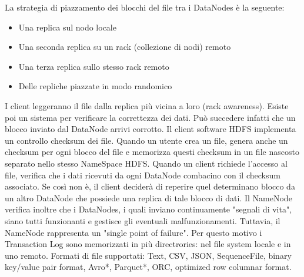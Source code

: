 \documentclass[a4page, 11pt]{article}
\begin{document}
La strategia di piazzamento dei blocchi del file tra i DataNodes è la seguente:
\begin{itemize}[noitemsep]
\item Una replica sul nodo locale
\item Una seconda replica su un rack (collezione di nodi) remoto
\item Una terza replica sullo stesso rack remoto
\item Delle repliche piazzate in modo randomico
\end{itemize}
I client leggeranno il file dalla replica più vicina a loro (rack awareness). Esiste poi un sistema per verificare la correttezza dei dati. Può succedere infatti che un blocco inviato dal DataNode arrivi corrotto. Il client software HDFS implementa un controllo checksum dei file. Quando un utente crea un file, genera anche un checksum per ogni blocco del file e memorizza questi checksum in un file nascosto separato nello stesso NameSpace HDFS. Quando un client richiede l’accesso al file, verifica che i dati ricevuti da ogni DataNode combacino con il checksum associato. Se così non è, il client deciderà di reperire quel determinano blocco da un altro DataNode che possiede una replica di tale blocco di dati. Il NameNode verifica inoltre che i DataNodes, i quali inviano continuamente "segnali di vita", siano tutti funzionanti e gestisce gli eventuali malfunzionamenti. Tuttavia, il NameNode rappresenta un "single point of failure". Per questo motivo i Transaction Log sono memorizzati in più directrories: nel file system locale e in uno remoto.\newline
Formati di file supportati: Text, CSV, JSON, SequenceFile, binary key/value pair format, Avro*, Parquet*, ORC, optimized row columnar format.
\end{document}
